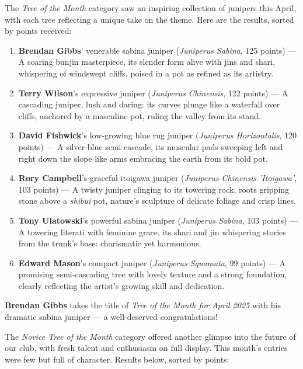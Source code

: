 \noindent 
The \textit{Tree of the Month} category saw an inspiring collection of junipers this April, with each tree reflecting a unique take on the theme.
Here are the results, sorted by points received:

\begin{enumerate}
    \item \textbf{Brendan Gibbs}' venerable sabina juniper (\textit{Juniperus Sabina}, 125 points) --- A soaring bunjin masterpiece, its slender form alive with jins and shari, whispering of windswept cliffs, poised in a pot as refined as its artistry.

    \item \textbf{Terry Wilson}'s expressive juniper (\textit{Juniperus Chinensis}, 122 points) --- A cascading juniper, lush and daring: its curves plunge like a waterfall over cliffs, anchored by a masculine pot, ruling the valley from its stand.

    \item \textbf{David Fishwick}'s low\--growing blue rug juniper (\textit{Juniperus Horizontalis}, 120 points) --- A silver\--blue semi\--cascade, its muscular pads sweeping left and right down the slope like arms embracing the earth from its bold pot.

    \item \textbf{Rory Campbell}'s graceful itoigawa juniper (\textit{Juniperus Chinensis 'Itoigawa'}, 103 points) --- A twisty juniper clinging to its towering rock, roots gripping stone above a \textit{shibui} pot, nature's sculpture of delicate foliage and crisp lines.

    \item \textbf{Tony Ulatowski}'s powerful sabina juniper (\textit{Juniperus Sabina}, 103 points) --- A towering literati with feminine grace, its shari and jin whispering stories from the trunk's base: charismatic yet harmonious.

    \item \textbf{Edward Mason}'s compact juniper (\textit{Juniperus Squamata}, 99 points) --- A promising semi\--cascading tree with lovely texture and a strong foundation, clearly reflecting the artist's growing skill and dedication.
\end{enumerate}

\noindent 
\textbf{Brendan Gibbs} takes the title of \textit{Tree of the Month for April 2025} with his dramatic sabina juniper --- a well\--deserved congratulations!

\noindent 
The \textit{Novice Tree of the Month} category offered another glimpse into the future of our club, with fresh talent and enthusiasm on full display.
This month's entries were few but full of character.
Results below, sorted by points:

